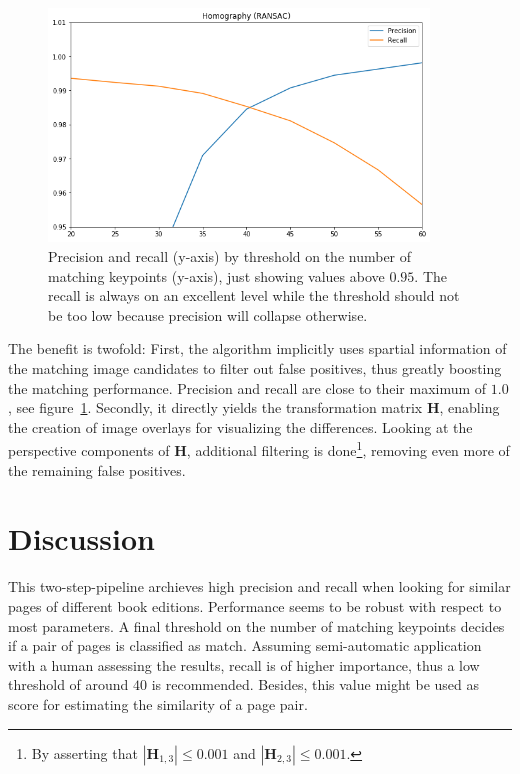 \documentclass{ltjarticle}
\begin{document}
\begin{figure}[p]
    \centering
    \includegraphics[width=0.9\textwidth]{ransac-performance.png}
    \caption[RANSAC performance]{Precision and recall (y-axis) by threshold on the number of matching keypoints (y-axis), just showing values above $0.95$. The recall is always on an excellent level while the threshold should not be too low because precision will collapse otherwise.}
    \label{fig:ransac}
\end{figure}

The benefit is twofold: First, the algorithm implicitly uses spartial information of the matching image candidates to filter out false positives, thus greatly boosting the matching performance. Precision and recall are close to their maximum of $1.0$, see figure~\ref{fig:ransac}. Secondly, it directly yields the transformation matrix $\mathbf{H}$, enabling the creation of image overlays for visualizing the differences. Looking at the perspective components of $\mathbf{H}$, additional filtering is done\footnote{By asserting that $|\mathbf{H}_{1,3}| \leq 0.001$ and $|\mathbf{H}_{2,3}| \leq 0.001$.}, removing even more of the remaining false positives.

\section{Discussion}

This two-step-pipeline archieves high precision and recall when looking for similar pages of different book editions. Performance seems to be robust with respect to most parameters. A final threshold on the number of matching keypoints decides if a pair of pages is classified as match. Assuming semi-automatic application with a human assessing the results, recall is of higher importance, thus a low threshold of around $40$ is recommended. Besides, this value might be used as score for estimating the similarity of a page pair.
\end{document}
